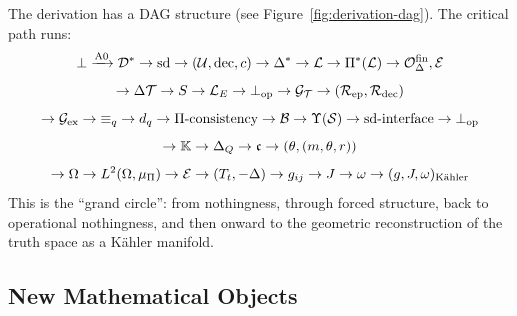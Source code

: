 The derivation has a DAG structure (see Figure~\ref{fig:derivation-dag}). The critical path runs:
\[
\bot \xrightarrow{\text{A0}} \mathcal{D}^* \to \mathrm{sd} \to (\mathcal{U}, \mathrm{dec}, c) \to \Delta^* \to \mathcal{L} \to \Pi^*(\mathcal{L}) \to \mathcal{O}^{\mathrm{fin}}_\Delta, \mathcal{E}
\]
\[
\to \Delta\mathcal{T} \to S \to \mathcal{L}_E \to \bot_{\mathrm{op}} \to \mathcal{G}_{\mathcal{T}} \to (\mathcal{R}_{\mathrm{ep}}, \mathcal{R}_{\mathrm{dec}})
\]
\[
\to \mathcal{G}_{\mathrm{ex}} \to {\equiv_q} \to d_q \to \Pi\text{-consistency} \to \mathcal{B} \to \Upsilon(\mathcal{S}) \to \mathrm{sd}\text{-interface} \to \bot_{\mathrm{op}}
\]
\[
\to \mathbb{K} \to \Delta_{Q} \to \mathfrak{c} \to (\theta, (m, \theta, r))
\]
\[
\to \Omega \to L^2(\Omega, \mu_\Pi) \to \mathcal{E} \to (T_t, -\Delta) \to g_{ij} \to J \to \omega \to (g, J, \omega)_{\mathrm{K\ddot{a}hler}}
\]
This is the ``grand circle'': from nothingness, through forced structure, back to operational nothingness, and then onward to the geometric reconstruction of the truth space as a K\"{a}hler manifold.


\subsection{New Mathematical Objects}

